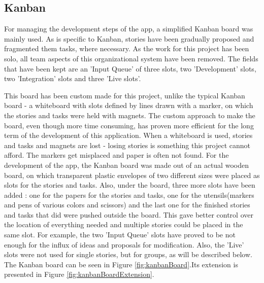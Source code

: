 \documentclass{article}
\begin{document}
\subsection{Kanban}

For managing the development steps of the app, a simplified Kanban board was
mainly used. As is specific to Kanban, stories have been gradually proposed and
fragmented them tasks, where necessary. As the work for this project has been
solo, all team aspects of this organizational system have been removed. The
fields that have been kept are an 'Input Queue' of three slots, two
'Development' slots, two 'Integration' slots and three 'Live slots'.\newline

This board has been custom made for this project, unlike the typical Kanban
board - a whiteboard with slots defined by lines drawn with a marker, on which
the stories and tasks were held with magnets. The custom approach to make the
board, even though more time consuming, has proven more efficient for the
long term of the development of this application. When a whiteboard is used,
stories and tasks and magnets are lost - losing stories is something this
project cannot afford. The markers get misplaced and paper is often not found.
For the development of the app, the Kanban board was made out of an actual
wooden board, on which transparent plastic envelopes of two different sizes were
placed as slots for the stories and tasks. Also, under the board, three more
slots have been added : one for the papers for the stories and tasks, one for
the utensils(markers and pens of various colors and scissors) and the last one
for the finished stories and tasks that did were pushed outside the board. This
gave better control over the location of everything needed and multiple stories
could be placed in the same slot. For example, the two 'Input Queue' slots have
proved to be not enough for the influx of ideas and proposals for modification.
Also, the 'Live' slots were not used for single stories, but for groups, as will
be described below. The Kanban board can be seen in Figure \ref{fig:kanbanBoard}.Its
extension is presented in Figure \ref{fig:kanbanBoardExtension}.\newline
\end{document}
